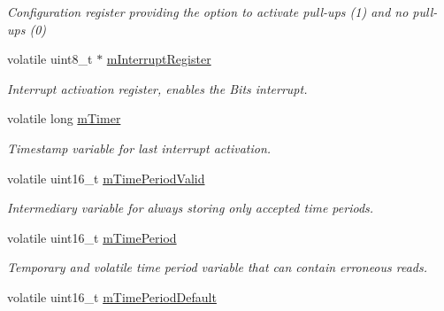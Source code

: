 \begin{DoxyCompactItemize}
\begin{DoxyCompactList}\small\item\em Configuration register providing the option to activate pull-\/ups (1) and no pull-\/ups (0) \end{DoxyCompactList}\item 
volatile uint8\+\_\+t $\ast$ \hyperlink{classSPMB_1_1InterruptInput_a3170d37b09700931f4d5eecdc03fd623}{m\+Interrupt\+Register}\hypertarget{classSPMB_1_1InterruptInput_a3170d37b09700931f4d5eecdc03fd623}{}\label{classSPMB_1_1InterruptInput_a3170d37b09700931f4d5eecdc03fd623}

\begin{DoxyCompactList}\small\item\em Interrupt activation register, enables the Bit\textquotesingle{}s interrupt. \end{DoxyCompactList}\item 
volatile long \hyperlink{classSPMB_1_1InterruptInput_a7ed0aa1999b25c9ecb5f475915621d6e}{m\+Timer}\hypertarget{classSPMB_1_1InterruptInput_a7ed0aa1999b25c9ecb5f475915621d6e}{}\label{classSPMB_1_1InterruptInput_a7ed0aa1999b25c9ecb5f475915621d6e}

\begin{DoxyCompactList}\small\item\em Timestamp variable for last interrupt activation. \end{DoxyCompactList}\item 
volatile uint16\+\_\+t \hyperlink{classSPMB_1_1InterruptInput_aea7eb654589b9835f2ce5a9a837de266}{m\+Time\+Period\+Valid}\hypertarget{classSPMB_1_1InterruptInput_aea7eb654589b9835f2ce5a9a837de266}{}\label{classSPMB_1_1InterruptInput_aea7eb654589b9835f2ce5a9a837de266}

\begin{DoxyCompactList}\small\item\em Intermediary variable for always storing only accepted time periods. \end{DoxyCompactList}\item 
volatile uint16\+\_\+t \hyperlink{classSPMB_1_1InterruptInput_aa1149ffe5132907852832825696d4a79}{m\+Time\+Period}\hypertarget{classSPMB_1_1InterruptInput_aa1149ffe5132907852832825696d4a79}{}\label{classSPMB_1_1InterruptInput_aa1149ffe5132907852832825696d4a79}

\begin{DoxyCompactList}\small\item\em Temporary and volatile time period variable that can contain erroneous reads. \end{DoxyCompactList}\item 
volatile uint16\+\_\+t \hyperlink{classSPMB_1_1InterruptInput_ae479068bfc0e3dec59ed0828e78129bc}{m\+Time\+Period\+Default}\hypertarget{classSPMB_1_1InterruptInput_ae479068bfc0e3dec59ed0828e78129bc}{}\label{classSPMB_1_1InterruptInput_ae479068bfc0e3dec59ed0828e78129bc}


\end{DoxyCompactItemize}
